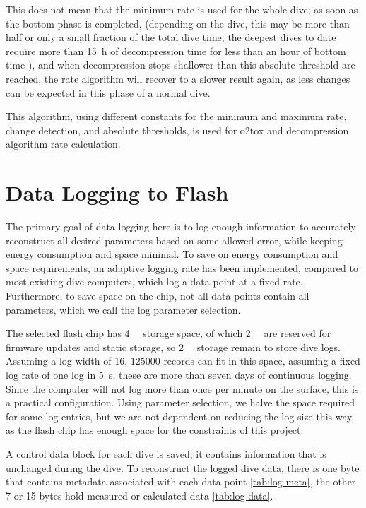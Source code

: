 This does not mean that the minimum rate is used for the whole dive; as soon as the bottom phase is completed, (depending on the dive, this may be more than half or only a small fraction of the total dive time, the deepest dives to date require more than \SI{15}{\hour} of decompression time for less than an hour of bottom time \cite{hydrogen-dive-2024}), and when decompression stops shallower than this absolute threshold are reached, the rate algorithm will recover to a slower result again, as less changes can be expected in this phase of a normal dive.

This algorithm, using different constants for the minimum and maximum rate, change detection, and absolute thresholds, is used for \gls{o2tox} and decompression algorithm rate calculation.

\section{Data Logging to Flash}
The primary goal of data logging here is to log enough information to accurately reconstruct all desired parameters based on some allowed error, while keeping energy consumption and space minimal. 
To save on energy consumption and space requirements, an adaptive logging rate has been implemented, compared to most existing dive computers, which log a data point at a fixed rate. 
Furthermore, to save space on the chip, not all data points contain all parameters, which we call the log parameter selection. 

The selected flash chip has \SI{4}{\mega\byte} storage space, of which \SI{2}{\mega\byte} are reserved for firmware updates and static storage, so \SI{2}{\mega\byte} storage remain to store dive logs. Assuming a log width of \SI{16}{\byte}, $125000$ records can fit in this space, assuming a fixed log rate of one log in \SI{5}{\second}, these are more than seven days of continuous logging. Since the computer will not log more than once per minute on the surface, this is a practical configuration. Using parameter selection, we halve the space required for some log entries, but we are not dependent on reducing the log size this way, as the flash chip has enough space for the constraints of this project.

A control data block for each dive is saved; it contains information that is unchanged during the dive.
To reconstruct the logged dive data, there is one byte that contains metadata associated with each data point \ref{tab:log-meta}, the other 7 or 15 bytes hold measured or calculated data \ref{tab:log-data}.
